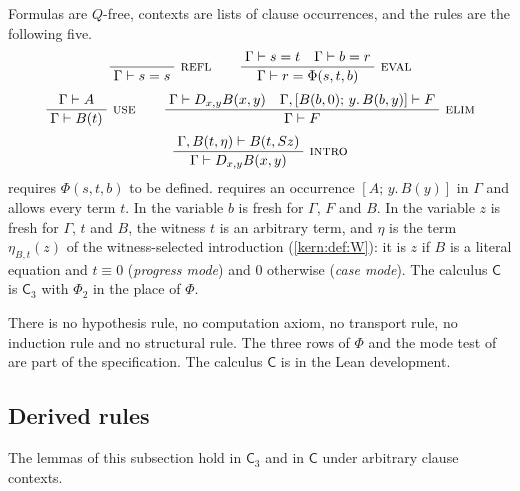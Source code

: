 \begin{definition}
\label{claus:def:c3}
Formulas are $Q$-free, contexts are lists of clause occurrences, and the
rules are the following five.
\[
 \infrule{}{\Gamma\proves s=s}\ \rulename{Refl}
 \qquad
 \infrule{\Gamma\proves s=t\quad\Gamma\proves b=r}
         {\Gamma\proves r=\Phi(s,t,b)}\ \rulename{Eval}
\]
\[
 \infrule{\Gamma\proves A}{\Gamma\proves B(t)}\ \rulename{Use}
 \qquad
 \infrule{\Gamma\proves\D{x}{y}B(x,y)\quad
          \Gamma,[B(b,0);\,y.\,B(b,y)]\proves F}
         {\Gamma\proves F}\ \rulename{Elim}
\]
\[
 \infrule{\Gamma,B(t,\eta)\proves B(t,\Suc z)}
         {\Gamma\proves\D{x}{y}B(x,y)}\ \rulename{Intro}
\]
 requires $\Phi(s,t,b)$ to be defined. 
requires an occurrence $[A;\,y.\,B(y)]$ in $\Gamma$ and allows every term
$t$. In  the variable $b$ is fresh for $\Gamma$, $F$ and $B$.
In  the variable $z$ is fresh for $\Gamma$, $t$ and $B$, the
witness $t$ is an arbitrary term, and $\eta$ is the term
$\eta_{B,t}(z)$ of the witness-selected introduction (\cref{kern:def:W}):
it is $z$ if $B$ is a literal equation and $t\equiv 0$ (\emph{progress
mode}) and $0$ otherwise (\emph{case mode}). The calculus $\mathsf{C}$ is
$\mathsf{C}_3$ with $\Phi_2$ in the place of $\Phi$.
\end{definition}

There is no hypothesis rule, no computation axiom, no transport rule, no
induction rule and no structural rule. The three rows of $\Phi$ and the
mode test of  are part of the specification. The calculus
$\mathsf{C}$ is  in the Lean development.

\subsection{Derived rules}

The lemmas of this subsection hold in $\mathsf{C}_3$ and in $\mathsf{C}$
under arbitrary clause contexts.

